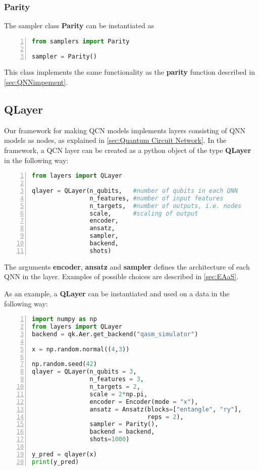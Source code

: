 \subsubsection*{Parity}
The sampler class \textbf{Parity} can be instantiated as
\begin{lstlisting}[language=python, numbers=left]
from samplers import Parity

sampler = Parity()
\end{lstlisting}
This class implements the same functionality as the \textbf{parity} function described in \autoref{sec:QNNimpement}.

\subsection{QLayer}\label{sec:QLayer}

Our framework for making QCN models implements layers consisting of QNN models as nodes, as explained in \autoref{sec:Quantum Circuit Network}. In the framework, a QCN layer can be created as a python object of the type \textbf{QLayer} in the following way:

\begin{lstlisting}[language=python, numbers=left]
from layers import QLayer

qlayer = QLayer(n_qubits,   #number of qubits in each QNN
                n_features, #number of input features
                n_targets,  #number of outputs, i.e. nodes
                scale,      #scaling of output
                encoder,
                ansatz,
                sampler,
                backend,
                shots)
\end{lstlisting}

The arguments \textbf{encoder}, \textbf{ansatz} and \textbf{sampler} defines the architecture of each QNN in the layer. Examples of possible choices are described in \autoref{sec:EAaS}. 

As an example, a \textbf{QLayer} can be instantiated and used on a data in the following way:


\begin{lstlisting}[language=python, numbers=left]
import numpy as np
from layers import QLayer
backend = qk.Aer.get_backend("qasm_simulator")

x = np.random.normal((4,3))

np.random.seed(42)
qlayer = QLayer(n_qubits = 3,
                n_features = 3,
                n_targets = 2,
                scale = 2*np.pi,
                encoder = Encoder(mode = "x"),
                ansatz = Ansatz(blocks=["entangle", "ry"],
                                reps = 2),
                sampler = Parity(),
                backend = backend,
                shots=1000)
                
y_pred = qlayer(x)
print(y_pred)
\end{lstlisting}

